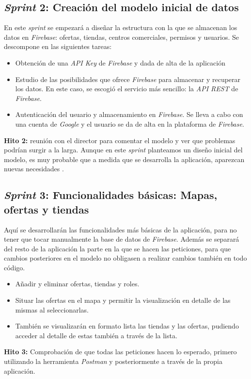 \subsection{\textit{Sprint} 2: Creación del modelo inicial de datos}
En este \textit{sprint} se empezará a diseñar la estructura con la que se almacenan los datos en \textit{Firebase}: ofertas, tiendas, centros comerciales, permisos y usuarios. Se descompone en las siguientes tareas:
\begin{itemize}
\item Obtención de una \textit{API Key} de \textit{Firebase} y dada de alta de la aplicación 
\item Estudio de las posibilidades que ofrece \textit{Firebase} para almacenar y recuperar los datos. En este caso, se escogió el servicio más sencillo: la \textit{API REST} de \textit{Firebase}.
\item Autenticación del usuario y almacenamiento en \textit{Firebase}. Se lleva a cabo con una cuenta de \textit{Google} y el usuario se da de alta en la plataforma de \textit{Firebase}.
\end{itemize}
\textbf{Hito 2:} reunión con el director para comentar el modelo y ver que problemas podrían surgir a la larga. Aunque en este \textit{sprint} planteamos un diseño inicial del modelo, es muy probable que a medida que se desarrolla la aplicación, aparezcan nuevas necesidades \cite{firomero87_relaciones_nodate}.

\subsection{\textit{Sprint} 3: Funcionalidades básicas: Mapas, ofertas y tiendas}
Aquí se desarrollarán las funcionalidades más básicas de la aplicación, para no tener que tocar manualmente la base de datos de \textit{Firebase}. 
Además se separará del resto de la aplicación la parte en la que se hacen las peticiones, para que cambios posteriores en el modelo no obligasen a realizar cambios también en todo código.
\begin{itemize}
\item Añadir y eliminar ofertas, tiendas y roles.
\item Situar las ofertas en el mapa y permitir la visualización en detalle de las mismas al seleccionarlas.
\item También se visualizarán en formato lista las tiendas y las ofertas, pudiendo acceder al detalle de estas también a través de la lista.
\end{itemize}
\textbf{Hito 3:} Comprobación de que todas las peticiones hacen lo esperado, primero utilizando la herramienta \textit{Postman} y posteriormente a través de la propia aplicación.

